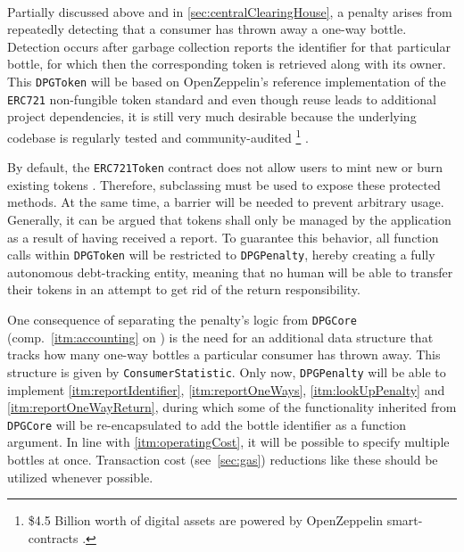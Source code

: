 \begin{description}[format={\storedescriptionlabel}]
	\item[Penalty]
	\hfill \\
	Partially discussed above and in \autoref{sec:centralClearingHouse}, a penalty arises from repeatedly detecting that a consumer has thrown away a one-way bottle. Detection occurs after garbage collection reports the identifier for that particular bottle, for which then the corresponding token is retrieved along with its owner. This \texttt{DPGToken} will be based on OpenZeppelin's reference implementation of the \texttt{ERC721} non-fungible token standard and even though reuse leads to additional project dependencies, it is still very much desirable because the underlying codebase is regularly tested and community-audited \footnote{\$4.5 Billion worth of digital assets are powered by OpenZeppelin smart-contracts \cite{openZeppelin}.} \cite{openZeppelinGitHub}. 
	
	By default, the \texttt{ERC721Token} contract does not allow users to mint new or burn existing tokens \cite{}. Therefore, subclassing must be used to expose these protected methods. At the same time, a barrier will be needed to prevent arbitrary usage. Generally, it can be argued that tokens shall only be managed by the application as a result of having received a report. To guarantee this behavior, all function calls within \texttt{DPGToken} will be restricted to \texttt{DPGPenalty}, hereby creating a fully autonomous debt-tracking entity, meaning that no human will be able to transfer their tokens in an attempt to get rid of the return responsibility.
	
	One consequence of separating the penalty's logic from \texttt{DPGCore} (comp.~\ref{itm:accounting} on ) is the need for an additional data structure that tracks how many one-way bottles a particular consumer has thrown away. This structure is given by \texttt{ConsumerStatistic}. Only now, \texttt{DPGPenalty} will be able to implement \ref{itm:reportIdentifier}, \ref{itm:reportOneWays}, \ref{itm:lookUpPenalty} and \ref{itm:reportOneWayReturn}, during which some of the functionality inherited from \texttt{DPGCore} will be re-encapsulated to add the bottle identifier as a function argument. In line with \ref{itm:operatingCost}, it will be possible to specify multiple bottles at once. Transaction cost (see~\ref{sec:gas}) reductions like these should be utilized whenever possible.
\end{description}


